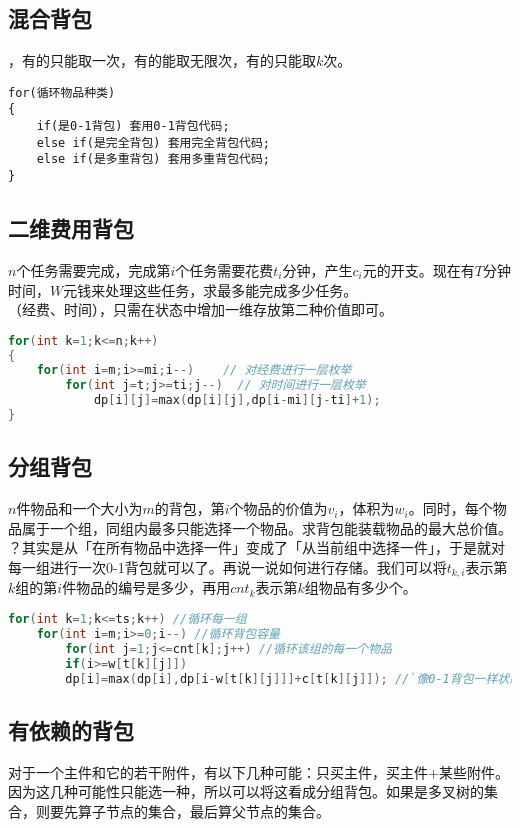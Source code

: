 \documentclass[a4paper]{book}
\begin{document}
\subsection*{混合背包}
，有的只能取一次，有的能取无限次，有的只能取$k$次。
\begin{lstlisting}
for(循环物品种类) 
{
    if(是0-1背包) 套用0-1背包代码;
    else if(是完全背包) 套用完全背包代码;
    else if(是多重背包) 套用多重背包代码;
}
\end{lstlisting}
\subsection*{二维费用背包}
$n$个任务需要完成，完成第$i$个任务需要花费$t_i$分钟，产生$c_i$元的开支。现在有$T$分钟时间，$W$元钱来处理这些任务，求最多能完成多少任务。\\
（经费、时间），只需在状态中增加一维存放第二种价值即可。
\begin{lstlisting}[language=c++]
for(int k=1;k<=n;k++) 
{
    for(int i=m;i>=mi;i--)    // 对经费进行一层枚举
        for(int j=t;j>=ti;j--)  // 对时间进行一层枚举
            dp[i][j]=max(dp[i][j],dp[i-mi][j-ti]+1);
}
\end{lstlisting}
\subsection*{分组背包}
$n$件物品和一个大小为$m$的背包，第$i$个物品的价值为$v_i$，体积为$w_i$。同时，每个物品属于一个组，同组内最多只能选择一个物品。求背包能装载物品的最大总价值。\\
？其实是从「在所有物品中选择一件」变成了「从当前组中选择一件」，于是就对每一组进行一次0-1背包就可以了。再说一说如何进行存储。我们可以将$t_{k,i}$表示第$k$组的第$i$件物品的编号是多少，再用$cnt_k$表示第$k$组物品有多少个。
\begin{lstlisting}[language=c++,escapeinside=``]
for(int k=1;k<=ts;k++) //循环每一组
    for(int i=m;i>=0;i--) //循环背包容量
        for(int j=1;j<=cnt[k];j++) //循环该组的每一个物品
        if(i>=w[t[k][j]])
        dp[i]=max(dp[i],dp[i-w[t[k][j]]]+c[t[k][j]]); //`像0-1背包一样状态转移`
\end{lstlisting}
\subsection*{有依赖的背包}
对于一个主件和它的若干附件，有以下几种可能：只买主件，买主件$+$某些附件。因为这几种可能性只能选一种，所以可以将这看成分组背包。如果是多叉树的集合，则要先算子节点的集合，最后算父节点的集合。
\end{document}
